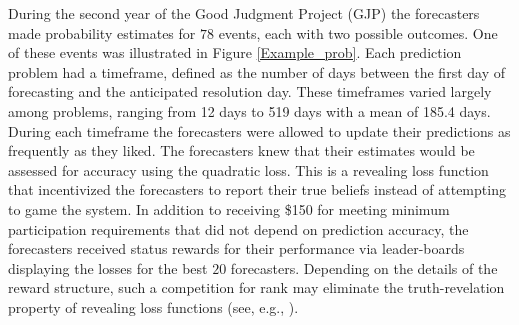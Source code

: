 \documentclass[11pt]{article}
\theoremstyle{definition}
\theoremstyle{definition}
\begin{document}
% 
During the second year of the Good Judgment Project (GJP) the forecasters made probability estimates for $78$ events, each with two possible outcomes. One of these events was illustrated in Figure \ref{Example_prob}. %
Each prediction problem had a timeframe, defined as the number of days between the first day of forecasting and the anticipated resolution day. 
These timeframes varied largely among problems, ranging from 12 days to 519 days with a mean of 185.4 days.
% 
During each timeframe the forecasters were allowed to update their predictions as frequently as they liked.  The forecasters knew that their estimates would be assessed for accuracy using the quadratic loss. 
This is a revealing loss function that incentivized the forecasters to report their true beliefs instead of attempting to game the system. In addition to receiving \$150 for meeting minimum participation requirements that did not depend on prediction accuracy, the forecasters received status rewards for their performance via leader-boards displaying the losses for the best $20$ forecasters. Depending on the details of the reward structure, such a competition for rank may eliminate the truth-revelation property of revealing loss functions (see, e.g., \citealt{lichtendahl2007probability}).


\end{document}
